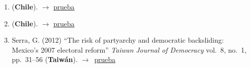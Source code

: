\documentclass[12 pt, letter]{article}
\newenvironment{CitasMiTrabajo}{
    \begin{footnotesize}
    \begin{enumerate}[label={\footnotesize\emph{cita~\arabic*}},ref=\arabic*] %
        \setlength{\itemsep}{.1\itemsep}
        \setlength{\parskip}{.1\parskip}
    }{\end{enumerate}\end{footnotesize}}
\begin{document}
        \begin{CitasMiTrabajo}

        \item {} (\textbf{Chile}). $\rightarrow$ \href{https://github.com/emagar/cv/blob/master/citasMiTrab/magarRomero2008/maldonado2013.pdf}{prueba}

        \item {} (\textbf{Chile}). $\rightarrow$ \href{https://github.com/emagar/cv/blob/master/citasMiTrab/magarRomero2008/palma2010.pdf}{prueba}

        \item Serra, G. (2012)
            ``The risk of partyarchy and democratic backsliding: Mexico's 2007 electoral reform''
            \emph{Taiwan Journal of Democracy}
            vol.\ 8, no.\ 1, pp.\ 31--56 (\textbf{Taiw\'an}). $\rightarrow$~\href{https://github.com/emagar/cv/blob/master/citasMiTrab/estevezEtalElecStud/serraElecRefMexico2012tjd.pdf}{prueba}

        \label{ncites:magar.romero.2008} %

        \end{CitasMiTrabajo}

\end{document}
